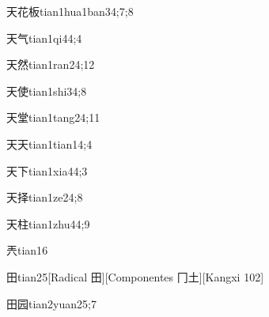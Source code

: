 \begin{verbete}{天花板}{tian1hua1ban3}{4;7;8}
\end{verbete}

\begin{verbete}{天气}{tian1qi4}{4;4}
\end{verbete}

\begin{verbete}{天然}{tian1ran2}{4;12}
\end{verbete}

\begin{verbete}{天使}{tian1shi3}{4;8}
\end{verbete}

\begin{verbete}{天堂}{tian1tang2}{4;11}
\end{verbete}

\begin{verbete}{天天}{tian1tian1}{4;4}
\end{verbete}

\begin{verbete}{天下}{tian1xia4}{4;3}
\end{verbete}

\begin{verbete}{天择}{tian1ze2}{4;8}
\end{verbete}

\begin{verbete}{天柱}{tian1zhu4}{4;9}
\end{verbete}

\begin{verbete}{兲}{tian1}{6}
\end{verbete}

\begin{verbete}{田}{tian2}{5}[Radical 田][Componentes 冂土][Kangxi 102]
\end{verbete}

\begin{verbete}{田园}{tian2yuan2}{5;7}
\end{verbete}

